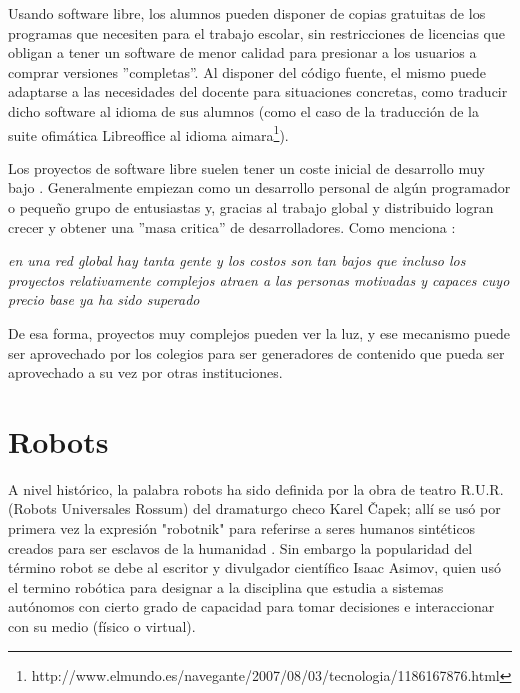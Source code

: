 Usando software libre, los alumnos pueden disponer de copias gratuitas de los programas que necesiten para el trabajo escolar, sin restricciones de licencias que obligan a tener un software de menor calidad para presionar a los usuarios a comprar versiones ''completas''. Al disponer del código fuente, el mismo puede adaptarse a las necesidades del docente para situaciones concretas, como traducir dicho software al idioma de sus alumnos (como el caso de la traducción de la suite ofimática Libreoffice al idioma aimara\footnote{http://www.elmundo.es/navegante/2007/08/03/tecnologia/1186167876.html}). 

Los proyectos de software libre suelen tener un coste inicial de desarrollo muy bajo \citep{adell_software_2007}. Generalmente empiezan como un desarrollo personal de algún programador o pequeño grupo de entusiastas y, gracias al trabajo global y distribuido logran crecer y obtener una ''masa critica'' de desarrolladores. Como menciona \cite{boyle_second_2003}:

\begin{center}
\textit{en una red global hay tanta gente y los costos son tan bajos que incluso los proyectos relativamente complejos atraen a las personas motivadas y capaces cuyo precio base ya ha sido superado}
\end{center}

 De esa forma, proyectos muy complejos pueden ver la luz, y ese mecanismo puede ser aprovechado por los colegios para ser generadores de contenido que pueda ser aprovechado a su vez por otras instituciones.

\section{Robots}

A nivel histórico, la palabra robots ha sido definida por la obra de teatro R.U.R. (Robots Universales Rossum) del dramaturgo checo Karel Čapek; allí se usó por primera vez la expresión "robotnik" para referirse a seres humanos sintéticos creados para ser esclavos de la humanidad  \citep{zabala_robotica_2007}. Sin embargo la popularidad del término robot se debe al escritor y divulgador científico Isaac Asimov, quien usó el termino robótica para designar a la disciplina que estudia a sistemas autónomos con cierto grado de capacidad para tomar decisiones e interaccionar con su medio (físico o virtual).

